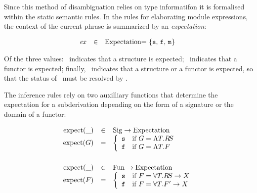 Since this method of disambiguation relies on type informatifon
it is formalised within the static semantic rules.
In the rules for elaborating module expressions, 
the context of the current phrase
is summarized by an {\sl expectation}:

\begin{displaymath}
\begin{array}{rcl}
\expect               & \in   & $\Expectation = \{\expectstr, \expectfun, \expectmod\} $
\end{array}
\end{displaymath}

Of the three values: \expectstr\ indicates that a structure is expected;
\expectfun\ indicates that a functor is expected; finally,
\expectmod\ indicates that a structure or a functor is expected, 
so that the status of \opp\longmodid\ must be resolved by \opp.

The inference rules rely on two auxilliary functions that determine the
expectation for a subderivation depending on the form of a signature 
or the domain of a functor:

\begin{displaymath}
\begin{array}{rcl}
\expectofsig{\_}               & \in   & \Sig \rightarrow \Expectation \\
\expectofsig{\G} &=& \left\{\begin{array}{l}
	                   \expectstr\quad \mbox{if $\G=\sig{\T}{\RS}$}\\
	                   \expectfun\quad \mbox{if $\G=\sig{\T}{\F}$}
	                 \end{array}	
	                 \right. \\
\vspace{6pt}\\
\expectoffun{\_}               & \in   & \Fun \rightarrow \Expectation \\
\expectoffun{\F} &=& \left\{\begin{array}{l}
	                       \expectstr
	                       \quad \mbox{if $\F=\fun{\T}{\RS}{\XM}$}\\
                               \expectfun
	                       \quad\mbox{if $\F=\fun{\T}{\F'}{\XM}$}
	                 \end{array}	
	                 \right. \\
\end{array}
\end{displaymath}


